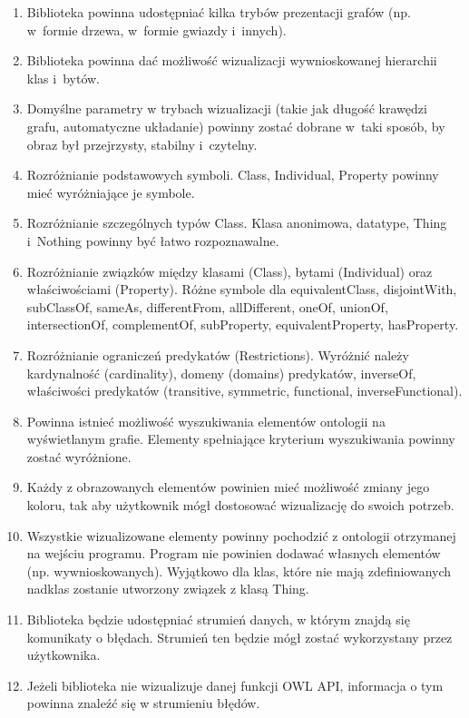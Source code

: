 \begin{enumerate}
 \item Biblioteka powinna udostępniać kilka trybów prezentacji grafów (np. w~formie drzewa, w~formie gwiazdy i~innych). 
 \item Biblioteka powinna dać możliwość wizualizacji wywnioskowanej hierarchii klas i~bytów. 
 \item  Domyślne parametry w trybach wizualizacji (takie jak długość krawędzi grafu, automatyczne układanie) powinny zostać dobrane w~taki sposób,
 by obraz był przejrzysty, stabilny i~czytelny.

\item Rozróżnianie podstawowych symboli. Class, Individual, Property powinny mieć wyróżniające je symbole. 
\item Rozróżnianie szczególnych typów Class. Klasa anonimowa, datatype, Thing i~Nothing powinny być łatwo rozpoznawalne. 
\item Rozróżnianie związków między klasami (Class), bytami (Individual) oraz właściwościami (Property). Różne symbole dla equivalentClass, disjointWith, 
subClassOf, sameAs, differentFrom, allDifferent, oneOf, unionOf, intersectionOf,  complementOf, subProperty, equivalentProperty, hasProperty.
\item Rozróżnianie ograniczeń predykatów (Restrictions). Wyróżnić należy kardynalność (cardinality), domeny (domains) predykatów, inverseOf, właściwości predykatów 
(transitive, symmetric, functional, inverseFunctional).
\item Powinna istnieć możliwość wyszukiwania elementów ontologii na wyświetlanym grafie. Elementy spełniające kryterium wyszukiwania powinny zostać wyróżnione.
\item Każdy z obrazowanych elementów powinien mieć możliwość zmiany jego koloru, tak aby użytkownik mógł dostosować wizualizację do swoich potrzeb. 
\item  Wszystkie wizualizowane elementy powinny pochodzić z ontologii otrzymanej na wejściu programu. Program nie powinien dodawać własnych elementów (np. wywnioskowanych). 
Wyjątkowo dla klas, które nie mają zdefiniowanych nadklas zostanie utworzony związek z klasą Thing. 
\item Biblioteka będzie udostępniać strumień danych, w którym znajdą się komunikaty o błędach. Strumień ten będzie mógł zostać wykorzystany przez użytkownika.
\item Jeżeli biblioteka nie wizualizuje danej funkcji OWL API, informacja o tym powinna znaleźć się w strumieniu błędów.
\end{enumerate}



